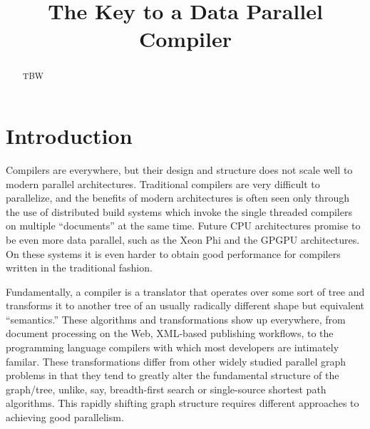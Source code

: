 \documentclass[numbers,preprint]{sigplanconf}
\begin{document}
\title{The Key to a Data Parallel Compiler}



\maketitle
\begin{abstract}
TBW
\end{abstract}


\section{Introduction}

Compilers are everywhere, but their design and structure does not scale well to modern 
parallel architectures. Traditional compilers are very difficult to parallelize, and the benefits of 
modern architectures is often seen only through the use of distributed build systems which invoke 
the single threaded compilers on multiple ``documents'' at the same time. Future CPU architectures 
promise to be even more data parallel, such as the Xeon Phi and the GPGPU architectures. On these 
systems it is even harder to obtain good performance for compilers written in the traditional fashion. 

Fundamentally, a compiler is a translator that operates over some sort of tree and transforms it to 
another tree of an usually radically different shape but equivalent ``semantics.'' These algorithms and 
transformations show up everywhere, from document processing on the Web, XML-based publishing 
workflows, to the programming language compilers with which most developers are intimately familar. 
These transformations differ from other widely studied parallel graph problems in that they tend to greatly 
alter the fundamental structure of the graph/tree, unlike, say, breadth-first search or single-source 
shortest path algorithms. This rapidly shifting graph structure requires different approaches to 
achieving good parallelism. 
\end{document}
